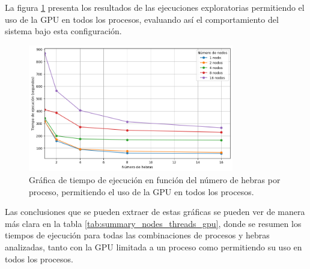La figura \ref{fig:exploratory_gpu_no-limit_time} presenta los resultados de las ejecuciones exploratorias permitiendo el uso de la GPU en todos los procesos, evaluando así el comportamiento del sistema bajo esta configuración.

\begin{figure}[ht]
    \centering
    \includegraphics[width=0.8\textwidth]{imagenes/cap5/exploratory_gpu_no-limit_time.png}
    \caption{Gráfica de tiempo de ejecución en función del número de hebras por proceso, permitiendo el uso de la GPU en todos los procesos.}
    \label{fig:exploratory_gpu_no-limit_time}
\end{figure}

Las conclusiones que se pueden extraer de estas gráficas se pueden ver de manera más clara en la tabla \ref{tab:summary_nodes_threads_gpu}, donde se resumen los tiempos de ejecución para todas las combinaciones de procesos y hebras analizadas, tanto con la GPU limitada a un proceso como permitiendo su uso en todos los procesos.

